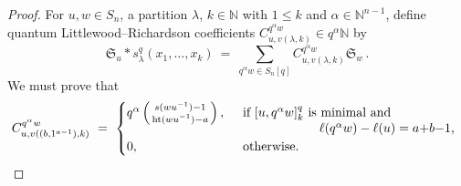 \documentclass[12pt,oneside,reqno]{amsart}
\theoremstyle{definition}
\numberwithin{equation}{section}
\newcommand{\NN}{{\mathbb N}}
\newcommand{\frakS}{{\mathfrak S}}
\DeclareMathOperator{\het}{ht}
\begin{document}
\begin{proof}
    For  $u,w \in S_n$, a partition $\lambda$, $k \in \NN$ with $1\leq k$ and $\alpha\in \NN^{n-1}$, define
    quantum Littlewood--Richardson coefficients $C^{q^\alpha w}_{u,v(\lambda,k)}\in q^\alpha \NN$ by 
    \begin{equation}
        \label{eq-definition-Cq}
        \frakS_u \ast s^q_\lambda(x_1, \ldots, x_k)
        \ =\ \sum_{q^\alpha w \in S_n[q]} C^{q^\alpha w}_{u,v(\lambda,k)} \frakS_w\,.
    \end{equation}
    We must prove that
    \begin{equation*}
        C^{q^\alpha w}_{u,v((b, 1^{a-1}),k)}\ =\ 
        \begin{cases}
            q^\alpha \left(\begin{smallmatrix} s(wu^{-1})-1 \\ \het(wu^{-1})-a \end{smallmatrix}\right),
            &
            \begin{array}[t]{lr}
                \text{if $[u, q^{\alpha}w]_k^q$ is minimal and} \\[-0.5ex]
                \qquad\qquad\qquad \text{$\ell(q^\alpha w) - \ell(u) = a{+}b{-}1$,}
            \end{array}
            \\
            0, &
            \begin{array}[t]{lr}
                \text{otherwise.}
            \end{array}
        \end{cases}
    \end{equation*}


\end{proof}
\end{document}
